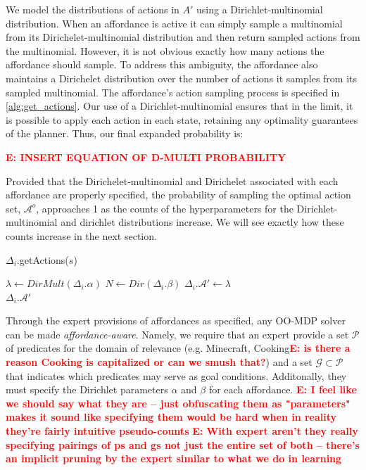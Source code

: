 \documentclass[conference]{IEEEtran}
\newcommand{\enote}[1]{\textcolor{Red}{\textbf{E: #1}}}
\begin{document}
We model the distributions of actions in $A'$ using a Dirichlet-multinomial distribution. 
When an affordance is active it can simply sample a multinomial from its Dirichelet-multinomial distribution and then return sampled actions from the multinomial. However, it is not obvious exactly how many actions the affordance should sample. To address this ambiguity, the affordance also maintains a Dirichelet distribution over the number of actions it samples from its sampled multinomial. The affordance's action sampling process is specified in \ref{alg:get_actions}. Our use of a Dirichlet-multinomial ensures that in the limit, it is possible to apply each action in each state, retaining any optimality guarantees of the planner. Thus, our final expanded probability is:

\enote{INSERT EQUATION OF D-MULTI PROBABILITY}

Provided that the Dirichelet-multinomial and Dirichelet associated with each affordance are properly specified, the probability of sampling the optimal action set, $\mathcal{A}^o$, approaches 1 as the counts of the hyperparameters for the Dirichlet-multinomial and dirichlet distributions increase. We will see exactly how these counts increase in the next section.



\begin{algorithm}
\caption{$\Delta_i.$getActions($s$)}
 \begin{algorithmic}[1]
    \State $\lambda \leftarrow DirMult(\Delta_i.\alpha)$
    \State $N \leftarrow Dir(\Delta_i.\beta)$
    \State $\Delta_i.\mathcal{A}' \leftarrow \lambda$
    \EndFor \\
    \Return $\Delta_i.\mathcal{A}'$
  \end{algorithmic}
  \label{alg:get_actions}
\end{algorithm}


Through the expert provisions of affordances as specified, any OO-MDP solver can be made
{\it affordance-aware}. Namely, we require that an expert provide a set $\mathcal{P}$ of predicates
for the domain of relevance (e.g. Minecraft, Cooking\enote{is there a reason Cooking is capitalized or can we smush that?}) and a set
$\mathcal{G} \subset \mathcal{P}$ that indicates which predicates may serve as goal conditions. Additonally, they must specify the Dirichlet parameters $\alpha$ and $\beta$ for each affordance. \enote{I feel like we should say what they are -- just obfuscating them as "parameters" makes it sound like specifying them would be hard when in reality they're fairly intuitive pseudo-counts} \enote{With expert aren't they really specifying pairings of ps and gs not just the entire set of both -- there's an implicit pruning by the expert similar to what we do in learning}
\end{document}
